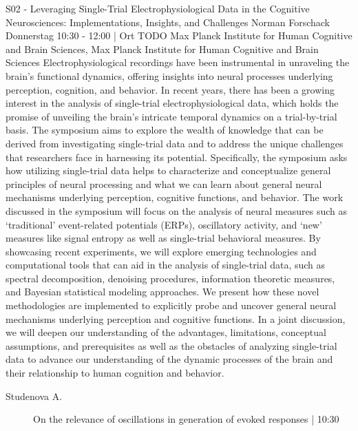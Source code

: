 
            \begin{symposium}
            {S02 - Leveraging Single-Trial Electrophysiological Data in the Cognitive Neurosciences: Implementations, Insights, and Challenges}
            {Norman Forschack}
            {Donnerstag 10:30 - 12:00 | Ort TODO}
            {Max Planck Institute for Human Cognitive and Brain Sciences, Max Planck Institute for Human Cognitive and Brain Sciences}
            Electrophysiological recordings have been instrumental in unraveling the brain's functional dynamics, offering insights into neural processes underlying perception, cognition, and behavior. In recent years, there has been a growing interest in the analysis of single-trial electrophysiological data, which holds the promise of unveiling the brain's intricate temporal dynamics on a trial-by-trial basis. The symposium aims to explore the wealth of knowledge that can be derived from investigating single-trial data and to address the unique challenges that researchers face in harnessing its potential.
Specifically, the symposium asks how utilizing single-trial data helps to characterize and conceptualize general principles of neural processing and what we can learn about general neural mechanisms underlying perception, cognitive functions, and behavior. The work discussed in the symposium will focus on the analysis of neural measures such as ‘traditional’ event-related potentials (ERPs), oscillatory activity, and ‘new’ measures like signal entropy as well as single-trial behavioral measures. By showcasing recent experiments, we will explore emerging technologies and computational tools that can aid in the analysis of single-trial data, such as spectral decomposition, denoising procedures, information theoretic measures, and Bayesian statistical modeling approaches. We present how these novel methodologies are implemented to explicitly probe and uncover general neural mechanisms underlying perception and cognitive functions. In a joint discussion, we will deepen our understanding of the advantages, limitations, conceptual assumptions, and prerequisites as well as the obstacles of analyzing single-trial data to advance our understanding of the dynamic processes of the brain and their relationship to human cognition and behavior.
            \begin{description}    
            
                \item [ Studenova A.] On the relevance of oscillations in generation of evoked responses \textcolor{mygray}{ | 10:30}    
                

\end{description}
\end{symposium}
